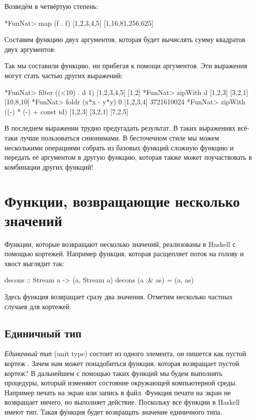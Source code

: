 Возведём в четвёртую степень:

\begin{code}
*FunNat> map (f . f) [1,2,3,4,5]
[1,16,81,256,625]
\end{code}

Составим функцию двух аргументов, которая будет
вычислять сумму квадратов двух аргументов:


Так мы составили функцию, ни прибегая к помощи аргументов.
Эти выражения могут стать частью других выражений:

\begin{code}
*FunNat> filter  ((<10) . d 1) [1,2,3,4,5]
[1,2]
*FunNat> zipWith d [1,2,3] [3,2,1]
[10,8,10]
*FunNat> foldr (x*x - y*y) 0 [1,2,3,4]
3721610024
*FunNat> zipWith ((-) * (-) + const id) [1,2,3] [3,2,1]
[7,2,5]
\end{code}

В последнем выражении трудно предугадать результат. В таких
выражениях всё-таки лучше пользоваться синонимами.
В бесточечном стиле мы можем 
несколькими операциями собрать из базовых функций
сложную функцию и передать её аргументом в другую функцию,
которая также может поучаствовать в комбинации других
функций!

\section{Функции, возвращающие несколько значений}

Функции, которые возвращают несколько значений, реализованы
в Haskell с помощью кортежей. Например функция, которая
расщепляет поток на голову и хвост выглядит так:

\begin{code}
decons :: Stream a -> (a, Stream a)
decons (a :& as) = (a, as)
\end{code}

Здесь функция возвращает сразу два значения. Отметим несколько
частных случаев для кортежей.

\subsection{Единичный тип}

\emph{Единичный тип} (unit type) состоит из одного элемента,
он пишется как пустой кортеж \In{()}. Зачем нам может понадобиться
функция, которая возвращает пустой кортеж? В дальнейшем с помощью
таких функций мы будем выполнять процедуры, который изменяют 
состояние окружающей компьютерной среды. Например печать на экран
или запись в файл. Функция печати на экран не возвращает ничего,
но выполняет действие. Поскольку все функции в Haskell имеют тип.
Такая функция будет возвращать значение единичного типа.


